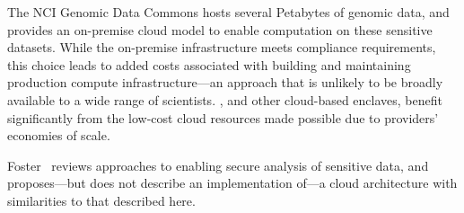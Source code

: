The NCI Genomic Data Commons \cite{grossman2016toward} hosts several Petabytes of
genomic data, and provides an on-premise cloud model to enable computation on these sensitive datasets.
While the on-premise infrastructure meets compliance requirements, this choice leads to added costs associated with
building and maintaining production compute infrastructure---an approach that is unlikely to be 
broadly available to a wide range of scientists. \NAMENS, and other cloud-based enclaves, benefit
significantly from the low-cost cloud resources made possible due to providers' economies of scale.

Foster~\cite{foster-stakeholder} reviews approaches to enabling secure analysis of sensitive data,
and proposes---but does not describe an implementation of---a cloud architecture with similarities to that described here. 



